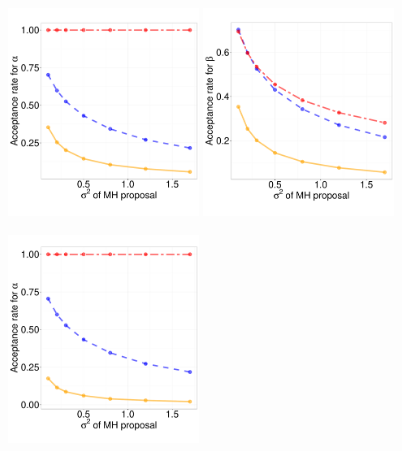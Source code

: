 {  \begin{figure}[H]
  \centering
  \begin{minipage}[!hp]{0.99\linewidth}
  \centering
  \begin{minipage}[!hp]{0.99\linewidth}
    \includegraphics [width=0.45\textwidth, angle=0]{figs/acc/EXP_D3alpha_k2.pdf}
    \includegraphics [width=0.45\textwidth, angle=0]{figs/acc/EXP_D3beta_k2.pdf}
  \end{minipage}
  \centering
  \begin{minipage}[!hp]{0.99\linewidth}
    \includegraphics [width=0.45\textwidth, angle=0]{figs/acc/EXP_D10alpha_k2.pdf}

\end{minipage}
\end{minipage}
\end{figure}}
